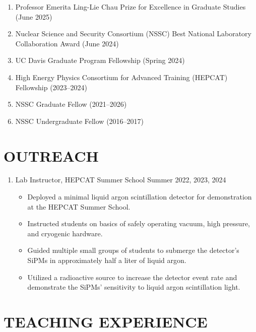 \documentclass[11pt,letterpaper]{article}
\begin{document}
\begin{enumerate}
  \item Professor Emerita Ling-Lie Chau Prize for Excellence in Graduate Studies
        (June 2025)
  \item Nuclear Science and Security Consortium (NSSC) Best National Laboratory
        Collaboration Award (June 2024)
  \item UC Davis Graduate Program Fellowship (Spring 2024)
  \item High Energy Physics Consortium for Advanced Training (HEPCAT) Fellowship
        (2023--2024)
  \item NSSC Graduate Fellow (2021--2026)
  \item NSSC Undergraduate Fellow (2016--2017)
\end{enumerate}

\section*{OUTREACH}

\begin{enumerate}
  \item Lab Instructor, HEPCAT Summer School \hfill Summer 2022, 2023, 2024
        \begin{itemize}
          \item Deployed a minimal liquid argon scintillation detector for demonstration
                at the HEPCAT Summer School.
          \item Instructed students on basics of safely operating vacuum, high pressure,
                and cryogenic hardware.
          \item Guided multiple small groups of students to submerge the detector's
                SiPMs in approximately half a liter of liquid argon.
          \item Utilized a radioactive source to increase the detector event rate and
                demonstrate the SiPMs' sensitivity to liquid argon scintillation light.
        \end{itemize}
\end{enumerate}

\section*{TEACHING EXPERIENCE}
\end{document}
